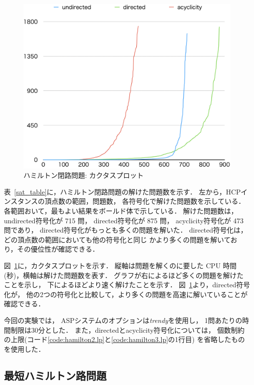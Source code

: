 \begin{figure}[tb]
\begin{center}
  \includegraphics[width=0.8\linewidth]{fig/cactus_fhcp.png}
\caption{ハミルトン閉路問題: カクタスプロット}
\label{cactus}
\end{center}
\end{figure}

表~\ref{sat_table}に，ハミルトン閉路問題の解けた問題数を示す．
左から，HCPインスタンスの頂点数の範囲，問題数，
各符号化で解けた問題数を示している．
各範囲おいて，最もよい結果をボールド体で示している．
% 
解けた問題数は，
\textsf{undirected}符号化が 715 問，
\textsf{directed}符号化が 875 問，
\textsf{acyclicity}符号化が 473 問であり，
\textsf{directed}符号化がもっとも多くの問題を解いた．
\textsf{directed}符号化は，どの頂点数の範囲においても他の符号化と同じ
かより多くの問題を解いており，その優位性が確認できる．

図~\ref{cactus}に，カクタスプロットを示す．
縦軸は問題を解くのに要した CPU 時間(秒)，横軸は解けた問題数を表す．
グラフが右によるほど多くの問題を解けたことを示し，
下によるほどより速く解けたことを示す．
図~\ref{cactus}より，\textsf{directed}符号化が，
他の2つの符号化と比較して，より多くの問題を高速に解いていることが確認できる．

今回の実験では，
ASPシステム{\clingo}のオプションは\textit{trendy}を使用し，
1問あたりの時間制限は30分とした．
また，\textsf{directed}と\textsf{acyclicity}符号化については，
個数制約の上限(コード\ref{code:hamilton2.lp}と\ref{code:hamilton3.lp}の1行目)
を省略したものを使用した．

\subsection{最短ハミルトン路問題}


